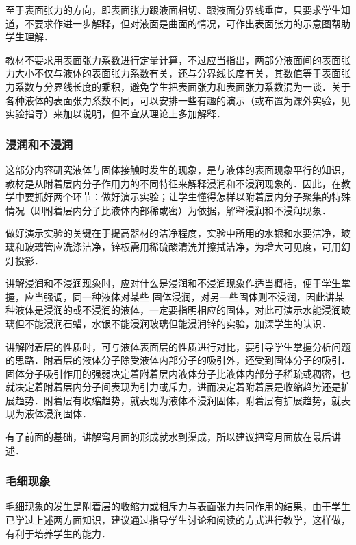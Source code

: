 至于表面张力的方向，即表面张力跟液面相切、跟液面分界线垂直，只要求学生知道，不要求作进一步解释，但对液面是曲面的情况，可作出表面张力的示意图帮助学生理解．

教材不要求用表面张力系数进行定量计算，不过应当指出，两部分液面间的表面张力大小不仅与液体的表面张力系数有关，还与分界线长度有关，其数值等于表面张力系数与分界线长度的乘积，避免学生把表面张力和表面张力系数混为一谈．关于各种液体的表面张力系数不同，可以安排一些有趣的演示（或布置为课外实验，见实验指导）来加以说明，但不宜从理论上多加解释．

\subsubsection{浸润和不浸润} 

这部分内容研究液体与固体接触时发生的现象，是与液体的表面现象平行的知识，教材是从附着层内分子作用力的不同特征来解释浸润和不浸润现象的．因此，在教学中要抓好两个环节：做好演示实验；让学生懂得怎样以附着层内分子聚集的特殊情况（即附着层内分子比液体内部稀或密）为依据，解释浸润和不浸润现象．

做好演示实验的关键在于提高器材的洁净程度，实验中所用的水银和水要洁净，玻璃和玻璃管应洗涤洁净，锌板需用稀硫酸清洗并擦拭洁净，为增大可见度，可用幻灯投影．

讲解浸润和不浸润现象时，应对什么是浸润和不浸润现象作适当概括，便于学生掌握，应当强调，同一种液体对某些
固体浸润，对另一些固体则不浸润，因此讲某种液体是浸润的或不浸润的液体，一定要指明相应的固体，对此可演示水能浸润玻璃但不能浸润石蜡，水银不能浸润玻璃但能浸润锌的实验，加深学生的认识．

讲解附着层的性质时，可与液体表面层的性质进行对比，要引导学生掌握分析问题的思路．附着层的液体分子除受液体内部分子的吸引外，还受到固体分子的吸引．固体分子吸引作用的强弱决定着附着层内液体分子比液体内部分子稀疏或稠密，也就决定着附着层内分子间表现为引力或斥力，进而决定着附着层是收缩趋势还是扩展趋势．附着层有收缩趋势，就表现为液体不浸润固体，附着层有扩展趋势，就表现为液体浸润固体．

有了前面的基础，讲解弯月面的形成就水到渠成，所以建议把弯月面放在最后讲述．

\subsubsection{毛细现象}

毛细现象的发生是附着层的收缩力或相斥力与表面张力共同作用的结果，由于学生已学过上述两方面知识，建议通过指导学生讨论和阅读的方式进行教学，这样做，有利于培养学生的能力．

